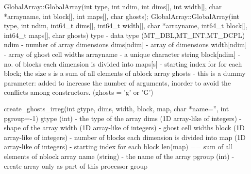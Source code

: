 \documentclass[12pt]{article}
\begin{document}
\begin{cxxapi}
GlobalArray::GlobalArray(int type, int ndim, int dims[], int width[], 
                         char *arrayname,
                         int block[], int maps[], char ghosts);
GlobalArray::GlobalArray(int type, int ndim, int64_t dims[], 
                         int64_t width[], char *arrayname,
                         int64_t block[], int64_t maps[], char ghosts)
   type          - data type (MT_DBL,MT_INT,MT_DCPL)                      \access{[input]}
   ndim          - number of array dimensions                             \access{[input]}
   dims[ndim]    - array of dimensions                                    \access{[input]}
   width[ndim]   - array of ghost cell widths                             \access{[input]}
   arrayname     - a unique character string                              \access{[input]}
   block[ndim]   - no. of blocks each dimension is divided into           \access{[input]}
   maps[s]       - starting index for for each block;
                   the size s is a sum of all elements of nblock array    \access{[input]}
   ghosts        - this is a dummy parameter: added to increase the
                   number of arguments, inorder to avoid the conflicts
                   among constructors. (ghosts = 'g' or 'G')              \access{[input]}
\end{cxxapi}

\begin{pyapi}
create_ghosts_irreg(int gtype, dims, width, block, map, char *name='', 
int pgroup=-1)
   gtype (int)                       - the type of the array
   dims (1D array-like of integers)  - shape of the array
   width (1D array-like of integers) - ghost cell widths
   block (1D array-like of integers) - number of blocks each dimension is 
                                       divided into
   map (1D array-like of integers)   - starting index for each block 
                                       len(map) == sum of all elements of 
                                       nblock array
   name (string)                     - the name of the array
   pgroup (int)                      - create array only as part of this 
                                       processor group
\end{pyapi}
\end{document}
